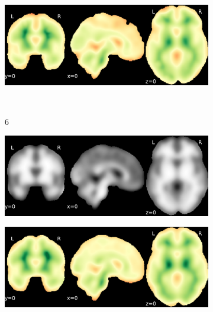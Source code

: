 \documentclass{article}
\begin{document}
\begin{landscape}
\begin{figure}
\begin{subfigure}[t]{0.2\paperheight}
        \end{subfigure}
        \begin{subfigure}[t]{0.2\paperheight}
            \centering
            \includegraphics[width=\textwidth]{figures/sig/15mm/rr.rs_ds001748_sub-adult15_sig.pdf}
        \end{subfigure} \\
        \begin{subfigure}[b][][c]{0.01\paperwidth} 6 \vspace*{15pt} \end{subfigure}
        \begin{subfigure}[t]{0.2\paperheight}
            \centering
            \includegraphics[width=\textwidth]{figures/sig/15mm/ieee_ds001748_sub-adult16.pdf}
        \end{subfigure}
        \begin{subfigure}[t]{0.2\paperheight}
            \centering
            \includegraphics[width=\textwidth]{figures/sig/15mm/rr_ds001748_sub-adult16_sig.pdf}

\end{subfigure}
\end{figure}
\end{landscape}
\end{document}
